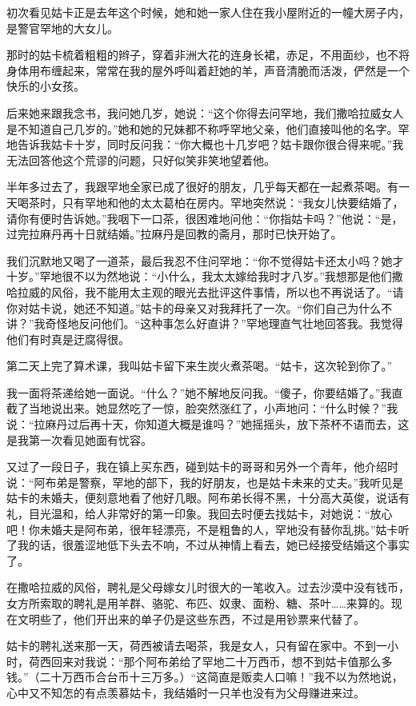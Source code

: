 \par 初次看见姑卡正是去年这个时候，她和她一家人住在我小屋附近的一幢大房子内，是警官罕地的大女儿。
\par 那时的姑卡梳着粗粗的辫子，穿着非洲大花的连身长裙，赤足，不用面纱，也不将身体用布缠起来，常常在我的屋外呼叫着赶她的羊，声音清脆而活泼，俨然是一个快乐的小女孩。
\par 后来她来跟我念书，我问她几岁，她说：“这个你得去问罕地，我们撒哈拉威女人是不知道自己几岁的。”她和她的兄妹都不称呼罕地父亲，他们直接叫他的名字。罕地告诉我姑卡十岁，同时反问我：“你大概也十几岁吧？姑卡跟你很合得来呢。”我无法回答他这个荒谬的问题，只好似笑非笑地望着他。
\par 半年多过去了，我跟罕地全家已成了很好的朋友，几乎每天都在一起煮茶喝。有一天喝茶时，只有罕地和他的太太葛柏在房内。罕地突然说：“我女儿快要结婚了，请你有便时告诉她。”我咽下一口茶，很困难地问他：“你指姑卡吗？”他说：“是，过完拉麻丹再十日就结婚。”拉麻丹是回教的斋月，那时已快开始了。
\par 我们沉默地又喝了一道茶，最后我忍不住问罕地：“你不觉得姑卡还太小吗？她才十岁。”罕地很不以为然地说：“小什么，我太太嫁给我时才八岁。”我想那是他们撒哈拉威的风俗，我不能用太主观的眼光去批评这件事情，所以也不再说话了。“请你对姑卡说，她还不知道。”姑卡的母亲又对我拜托了一次。“你们自己为什么不讲？”我奇怪地反问他们。“这种事怎么好直讲？”罕地理直气壮地回答我。我觉得他们有时真是迂腐得很。
\par 第二天上完了算术课，我叫姑卡留下来生炭火煮茶喝。“姑卡，这次轮到你了。”
\par 我一面将茶递给她一面说。“什么？”她不解地反问我。“傻子，你要结婚了。”我直截了当地说出来。她显然吃了一惊，脸突然涨红了，小声地问：“什么时候？”我说：“拉麻丹过后再十天，你知道大概是谁吗？”她摇摇头，放下茶杯不语而去，这是我第一次看见她面有忧容。
\par 又过了一段日子，我在镇上买东西，碰到姑卡的哥哥和另外一个青年，他介绍时说：“阿布弟是警察，罕地的部下，我的好朋友，也是姑卡未来的丈夫。”我听见是姑卡的未婚夫，便刻意地看了他好几眼。阿布弟长得不黑，十分高大英俊，说话有礼，目光温和，给人非常好的第一印象。我回去时便去找姑卡，对她说：“放心吧！你未婚夫是阿布弟，很年轻漂亮，不是粗鲁的人，罕地没有替你乱挑。”姑卡听了我的话，很羞涩地低下头去不响，不过从神情上看去，她已经接受结婚这个事实了。
\par 在撒哈拉威的风俗，聘礼是父母嫁女儿时很大的一笔收入。过去沙漠中没有钱币，女方所索取的聘礼是用羊群、骆驼、布匹、奴隶、面粉、糖、茶叶……来算的。现在文明些了，他们开出来的单子仍是这些东西，不过是用钞票来代替了。
\par 姑卡的聘礼送来那一天，荷西被请去喝茶，我是女人，只有留在家中。不到一小时，荷西回来对我说：“那个阿布弟给了罕地二十万西币，想不到姑卡值那么多钱。”（二十万西币合台币十三万多。）“这简直是贩卖人口嘛！”我不以为然地说，心中又不知怎的有点羡慕姑卡，我结婚时一只羊也没有为父母赚进来过。
